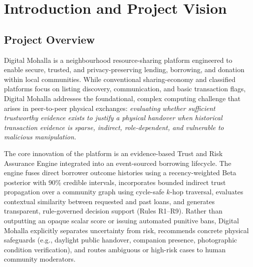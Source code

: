 \chapter{Introduction and Project Vision}

\section{Project Overview}
Digital Mohalla is a neighbourhood resource-sharing platform engineered to enable secure, trusted, and privacy-preserving lending, borrowing, and donation within local communities. While conventional sharing-economy and classified platforms focus on listing discovery, communication, and basic transaction flags, Digital Mohalla addresses the foundational, complex computing challenge that arises in peer-to-peer physical exchanges: \textit{evaluating whether sufficient trustworthy evidence exists to justify a physical handover when historical transaction evidence is sparse, indirect, role-dependent, and vulnerable to malicious manipulation.}

The core innovation of the platform is an evidence-based Trust and Risk Assurance Engine integrated into an event-sourced borrowing lifecycle. The engine fuses direct borrower outcome histories using a recency-weighted Beta posterior with 90\% credible intervals, incorporates bounded indirect trust propagation over a community graph using cycle-safe $k$-hop traversal, evaluates contextual similarity between requested and past loans, and generates transparent, rule-governed decision support (Rules R1--R9). Rather than outputting an opaque scalar score or issuing automated punitive bans, Digital Mohalla explicitly separates uncertainty from risk, recommends concrete physical safeguards (e.g., daylight public handover, companion presence, photographic condition verification), and routes ambiguous or high-risk cases to human community moderators.

